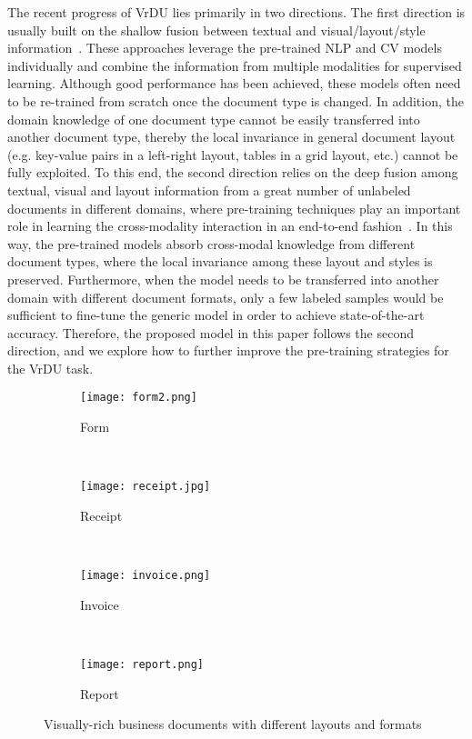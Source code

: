 \documentclass{article} \usepackage{iclr2021_conference,times}
\begin{document}
The recent progress of VrDU lies primarily in two directions. The first direction is usually built on the shallow fusion between textual and visual/layout/style information~\citep{Yang_2017,liu-etal-2019-graph,ijcai2019-466,yu2020pick,majumder-etal-2020-representation,Wei_2020,zhang2020trie}. These approaches leverage the pre-trained NLP and CV models individually and combine the information from multiple modalities for supervised learning. Although good performance has been achieved, these models often need to be re-trained from scratch once the document type is changed. In addition, the domain knowledge of one document type cannot be easily transferred into another document type, thereby the local invariance in general document layout (e.g. key-value pairs in a left-right layout, tables in a grid layout, etc.) cannot be fully exploited. To this end, the second direction relies on the deep fusion among textual, visual and layout information from a great number of unlabeled documents in different domains, where pre-training techniques play an important role in learning the cross-modality interaction in an end-to-end fashion~\citep{Lockard_2020,10.1145/3394486.3403172}. In this way, the pre-trained models absorb cross-modal knowledge from different document types, where the local invariance among these layout and styles is preserved. Furthermore, when the model needs to be transferred into another domain with different document formats, only a few labeled samples would be sufficient to fine-tune the generic model in order to achieve state-of-the-art accuracy. Therefore, the proposed model in this paper follows the second direction, and we explore how to further improve the pre-training strategies for the VrDU task.


\begin{figure*}[t]
\centering
    \begin{subfigure}[b]{0.23\textwidth}
        \texttt{[image: form2.png]}
        \caption{Form}
        \label{fig:1a}
    \end{subfigure}
    ~ \begin{subfigure}[b]{0.23\textwidth}
        \texttt{[image: receipt.jpg]}
        \caption{Receipt}
        \label{fig:1b}
    \end{subfigure}
    ~ \begin{subfigure}[b]{0.23\textwidth}
        \texttt{[image: invoice.png]}
        \caption{Invoice}
        \label{fig:1c}
    \end{subfigure}
    ~
    \begin{subfigure}[b]{0.23\textwidth}
        \texttt{[image: report.png]}
        \caption{Report}
        \label{fig:1d}
    \end{subfigure}
    \caption{Visually-rich business documents with different layouts and formats}\label{fig:1}
\end{figure*}
\end{document}
